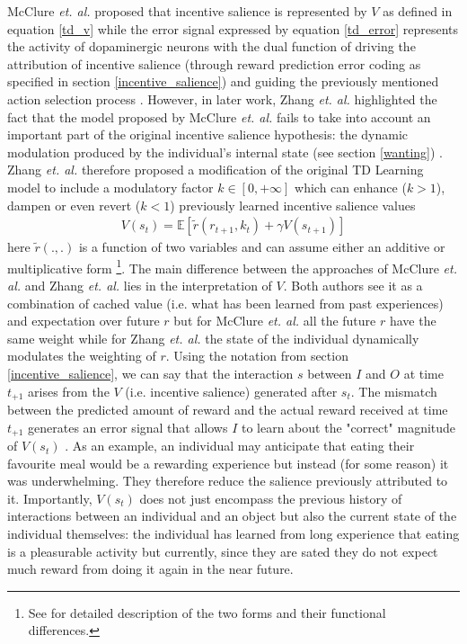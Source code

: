 
McClure \textit{et. al.} proposed that incentive salience is represented by $V$ as defined in equation \ref{td_v} while the error signal expressed by equation \ref{td_error} represents the activity of dopaminergic neurons with the dual function of driving the attribution of incentive salience (through reward prediction error coding as specified in section \ref{incentive_salience}) and guiding the previously mentioned action selection process \cite{schultz1997neural,mcclure2003computational,o2003temporal}. However, in later work, Zhang \textit{et. al.} highlighted the fact that the model proposed by McClure \textit{et. al.} fails to take into account an important part of the original incentive salience hypothesis: the dynamic modulation produced by the individual's internal state (see section \ref{wanting}) \cite{toates1994comparing,mcclure2003computational,berridge2004motivation,zhang2009neural,tindell2009dynamic,berridge2012prediction}. Zhang \textit{et. al.} therefore proposed a modification of the original TD Learning model to include a modulatory factor $k \in [0, +\infty]$ which can enhance ($k > 1$), dampen or even revert ($k < 1$) previously learned incentive salience values
\begin{align}
    \label{zhang_td_v}
    V(s_t) = \mathbb{E}[\tilde{r}(r_{t+1},k_{t}) + \gamma V(s_{t+1})]
\end{align}
here $\tilde{r}(.,.)$ is a function of two variables and can assume either an additive or multiplicative form \footnote{See \cite{zhang2009neural} for detailed description of the two forms and their functional differences.}. The main difference between the approaches of McClure \textit{et. al.} and Zhang \textit{et. al.} lies in the interpretation of $V$. Both authors see it as a combination of cached value (i.e. what has been learned from past experiences) and expectation over future $r$ but for McClure \textit{et. al.} all the future $r$ have the same weight while for Zhang \textit{et. al.} the state of the individual dynamically modulates the weighting of $r$. Using the notation from section \ref{incentive_salience}, we can say that the interaction $s$ between $I$ and $O$ at time $t_{+1}$ arises from the $V$ (i.e. incentive salience) generated after $s_{t}$. The mismatch between the predicted amount of reward and the actual reward received at time $t_{+1}$ generates an error signal that allows $I$ to learn about the "correct" magnitude of $V(s_{t})$ \cite{schultz2017reward} . As an example, an individual may anticipate that eating their favourite meal would be a rewarding experience but instead (for some reason) it was underwhelming. They therefore reduce the salience previously attributed to it. Importantly, $V(s_{t})$ does not just encompass the previous history of interactions between an individual and an object but also the current state of the individual themselves: the individual has learned from long experience that eating is a pleasurable activity but currently, since they are sated they do not expect much reward from doing it again in the near future.  \\
